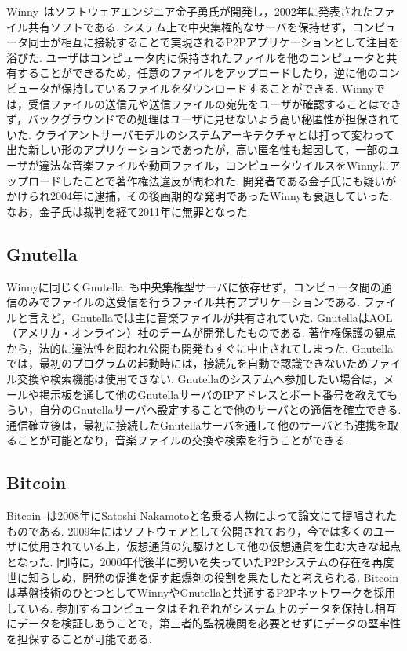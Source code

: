 Winny~\cite{Winny}はソフトウェアエンジニア金子勇氏が開発し，2002年に発表されたファイル共有ソフトである.
システム上で中央集権的なサーバを保持せず，コンピュータ同士が相互に接続することで実現されるP2Pアプリケーションとして注目を浴びた.
ユーザはコンピュータ内に保持されたファイルを他のコンピュータと共有することができるため，任意のファイルをアップロードしたり，逆に他のコンピュータが保持しているファイルをダウンロードすることができる.
Winnyでは，受信ファイルの送信元や送信ファイルの宛先をユーザが確認することはできず，バックグラウンドでの処理はユーザに見せないよう高い秘匿性が担保されていた.
クライアントサーバモデルのシステムアーキテクチャとは打って変わって出た新しい形のアプリケーションであったが，高い匿名性も起因して，一部のユーザが違法な音楽ファイルや動画ファイル，コンピュータウイルスをWinnyにアップロードしたことで著作権法違反が問われた.
開発者である金子氏にも疑いがかけられ2004年に逮捕，その後画期的な発明であったWinnyも衰退していった.
なお，金子氏は裁判を経て2011年に無罪となった.

\subsection{Gnutella}

Winnyに同じくGnutella~\cite{Gnutella}も中央集権型サーバに依存せず，コンピュータ間の通信のみでファイルの送受信を行うファイル共有アプリケーションである.
ファイルと言えど，Gnutellaでは主に音楽ファイルが共有されていた.
GnutellaはAOL（アメリカ・オンライン）社のチームが開発したものである.
著作権保護の観点から，法的に違法性を問われ公開も開発もすぐに中止されてしまった.
Gnutellaでは，最初のプログラムの起動時には，接続先を自動で認識できないためファイル交換や検索機能は使用できない.
Gnutellaのシステムへ参加したい場合は，メールや掲示板を通して他のGnutellaサーバのIPアドレスとポート番号を教えてもらい，自分のGnutellaサーバへ設定することで他のサーバとの通信を確立できる.
通信確立後は，最初に接続したGnutellaサーバを通して他のサーバとも連携を取ることが可能となり，音楽ファイルの交換や検索を行うことができる.

\subsection{Bitcoin}

Bitcoin~\cite{Bitcoin}は2008年にSatoshi Nakamotoと名乗る人物によって論文にて提唱されたものである.
2009年にはソフトウェアとして公開されており，今では多くのユーザに使用されている上，仮想通貨の先駆けとして他の仮想通貨を生む大きな起点となった.
同時に，2000年代後半に勢いを失っていたP2Pシステムの存在を再度世に知らしめ，開発の促進を促す起爆剤の役割を果たしたと考えられる.
Bitcoinは基盤技術のひとつとしてWinnyやGnutellaと共通するP2Pネットワークを採用している.
参加するコンピュータはそれぞれがシステム上のデータを保持し相互にデータを検証しあうことで，第三者的監視機関を必要とせずにデータの堅牢性を担保することが可能である.

